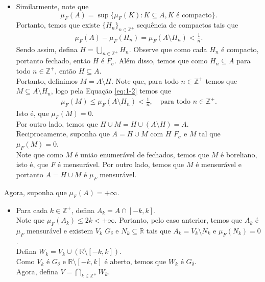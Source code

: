 \begin{homeworkProblem}[1]
\begin{solution}
\begin{itemize}
  \item Similarmente, note que
    \begin{equation}\label{eq:1-2}
      \mu_F(A)=\sup\{\mu_F(K):K\subseteq A, K\text{ é compacto} \}.
    \end{equation}
     Portanto, temos que existe $\{H_n\}_{n\in\mathbb{Z}^{+}}$ sequência de compactos tais que
    \begin{align*}
      \mu_F(A)-\mu_F(H_n)=\mu_F(A\setminus H_n)<\frac{1}{n}.
    \end{align*}
    Sendo assim, defina $H=\bigcup_{n\in\mathbb{Z}^{+}}H_n$. Observe que como cada $H_n$ é compacto, portanto fechado, então $H$ é $F_\sigma$. Além disso, temos que como $H_n\subseteq A$ para todo $n\in\mathbb{Z}^{+}$, então $H\subseteq A$.\\
    Portanto, definimos $M=A\setminus H$. Note que, para todo $n\in\mathbb{Z}^{+}$ temos que $M\subseteq A\setminus H_n$, logo pela Equação \eqref{eq:1-2} temos que
    \begin{align*}
      \mu_F(M)\leq \mu_F(A\setminus H_n)<\frac{1}{n},\quad\text{para todo }n\in\mathbb{Z}^{+}.
    \end{align*}
    Isto é, que $\mu_F(M)=0$.\\
    Por outro lado, temos que $H\cup M= H\cup (A\setminus H)=A$.\\
    Reciprocamente, suponha que $A=H\cup M$ com $H$ $F_\sigma$ e $M$ tal que $\mu_F(M)=0$.\\
    Note que como $M$ é união enumerável de fechados, temos que $M$ é boreliano, isto é, que $F$ é mensurável. Por outro lado, temos que $M$ é mensurável e portanto $A=H\cup M$ é $\mu_F$ mensurável.
  \end{itemize}
  Agora, suponha que $\mu_F(A)=+\infty$.\\
  \begin{itemize}
    \item Para cada $k\in\mathbb{Z}^{+}$, defina $A_k=A\cap[-k,k]$.\\
    Note que $\mu_F(A_k)\leq 2k<+\infty$. Portanto, pelo caso anterior, temos que $A_k$ é $\mu_F$ mensurável e existem $V_k$ $G_\delta$ e $N_k\subseteq\mathbb{R}$ tais que $A_k=V_k\setminus N_k$ e $\mu_F(N_k)=0$.\\
    Defina $W_k=V_k\cup\left(\mathbb{R}\setminus[-k,k]\right)$.\\
    Como $V_k$ é $G_\delta$ e $\mathbb{R}\setminus[-k,k]$ é aberto, temos que $W_k$ é $G_\delta$.\\
    Agora, defina $V=\bigcap_{k\in\mathbb{Z}^{+}}W_k$.\\

\end{itemize}
\end{solution}
\end{homeworkProblem}

